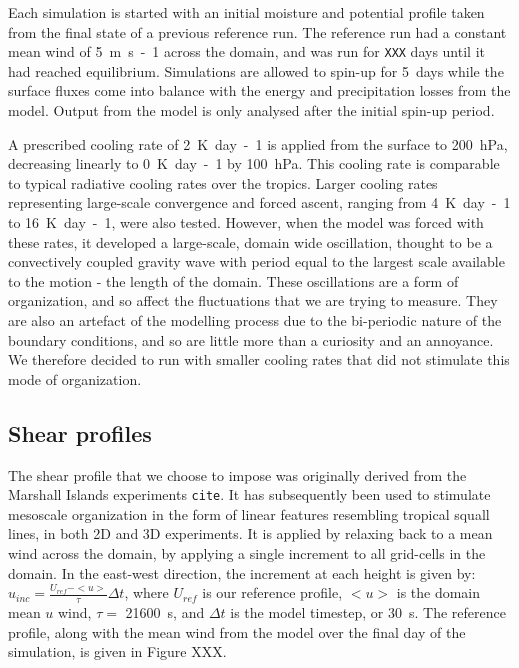 \documentclass[11pt,a4paper]{article}
\newcommand\todo[1]{\texttt{#1}}
\begin{document}
Each simulation is started with an initial moisture and potential profile taken from the final state of a previous reference run. The reference run had a constant mean wind of \SI{5}{m.s-1} across the domain, and was run for \todo{XXX} days until it had reached equilibrium. Simulations are allowed to spin-up for \SI{5}{days} while the surface fluxes come into balance with the energy and precipitation losses from the model. Output from the model is only analysed after the initial spin-up period.

A prescribed cooling rate of \SI{2}{K.day-1} is applied from the surface to \SI{200}{hPa}, decreasing linearly to \SI{0}{K.day-1} by \SI{100}{hPa}. This cooling rate is comparable to typical radiative cooling rates over the tropics. Larger cooling rates representing large-scale convergence and forced ascent, ranging from \SI{4}{K.day-1} to \SI{16}{K.day-1}, were also tested. However, when the model was forced with these rates, it developed a large-scale, domain wide oscillation, thought to be a convectively coupled gravity wave with period equal to the largest scale available to the motion - the length of the domain. These oscillations are a form of organization, and so affect the fluctuations that we are trying to measure. They are also an artefact of the modelling process due to the bi-periodic nature of the boundary conditions, and so are little more than a curiosity and an annoyance. We therefore decided to run with smaller cooling rates that did not stimulate this mode of organization.

\subsection{Shear profiles}

The shear profile that we choose to impose was originally derived from the Marshall Islands experiments \todo{cite}. It has subsequently been used to stimulate mesoscale organization in the form of linear features resembling tropical squall lines, in both 2D \cite{tompkins} and 3D \cite{grabowski, CC2006II} experiments. It is applied by relaxing back to a mean wind across the domain, by applying a single increment to all grid-cells in the domain. In the east-west direction, the increment at each height is given by: $u_{inc} = \frac{U_{ref} - <u>}{\tau} \Delta t$, where $U_{ref}$ is our reference profile, $<u>$ is the domain mean $u$ wind, $\tau = $ \SI{21600}{s}, and $\Delta t$ is the model timestep, or \SI{30}{s}. The reference profile, along with the mean wind from the model over the final day of the simulation, is given in Figure XXX.
\end{document}

